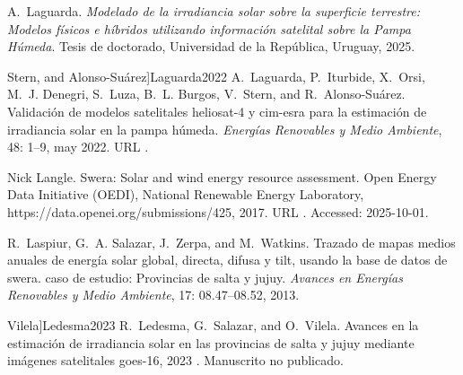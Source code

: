 \documentclass[letterpaper,12pt, twoside]{report}
\providecommand{\DIFdeltex}[1]{{\protect\color{red} \scriptsize #1}} %
\providecommand{\DIFdel}[1]{\texorpdfstring{\DIFdeltex{#1}}{}} %
\begin{document}
\DIFdel{A.~Laguarda.
}%
\DIFdel{\emph{Modelado de la irradiancia solar sobre la superficie terrestre:
  Modelos físicos e híbridos utilizando información satelital sobre la Pampa
  Húmeda}.
}%
\DIFdel{Tesis de doctorado, Universidad de la República, Uruguay, 2025.
}%

  Stern, and Alonso-Suárez]{Laguarda2022}
\DIFdel{A.~Laguarda, P.~Iturbide, X.~Orsi, M.~J. Denegri, S.~Luza, B.~L. Burgos,
  V.~Stern, and R.~Alonso-Suárez.
}%
\DIFdel{Validación de modelos satelitales heliosat-4 y cim-esra para la
  estimación de irradiancia solar en la pampa húmeda.
}%
\DIFdel{\emph{Energías Renovables y Medio Ambiente}, 48:}%
\DIFdel{1–9, may
  2022.
}%
\DIFdel{URL
  }%
\DIFdel{.
}%

\DIFdel{Nick Langle.
}%
\DIFdel{Swera: Solar and wind energy resource assessment.
}%
\DIFdel{Open Energy Data Initiative (OEDI), National Renewable Energy
  Laboratory, https://data.openei.org/submissions/425, 2017.
}%
\DIFdel{URL }%
\DIFdel{.
}%
\DIFdel{Accessed: 2025-10-01.
}%

\DIFdel{R.~Laspiur, G.~A. Salazar, J.~Zerpa, and M.~Watkins.
}%
\DIFdel{Trazado de mapas medios anuales de energía solar global, directa,
  difusa y tilt, usando la base de datos de swera. caso de estudio: Provincias
  de salta y jujuy.
}%
\DIFdel{\emph{Avances en Energías Renovables y Medio Ambiente}, 17:}%
\DIFdel{08.47--08.52, 2013.
}%

  Vilela]{Ledesma2023}
\DIFdel{R.~Ledesma, G.~Salazar, and O.~Vilela.
}%
\DIFdel{Avances en la estimación de irradiancia solar en las provincias de
  salta y jujuy mediante imágenes satelitales goes-16, 2023}%
\DIFdel{.
}%
\DIFdel{Manuscrito no publicado.
}%
\end{document}
